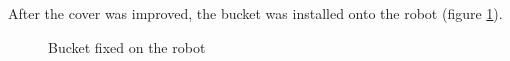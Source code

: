 After the cover was improved, the bucket was installed onto the robot (figure \ref{Bucket2.7}).

\begin{figure}[H]
	\begin{minipage}[h]{1\linewidth}
		\caption{Bucket fixed on the robot}
		\label{Bucket2.7}
	\end{minipage}
\end{figure}